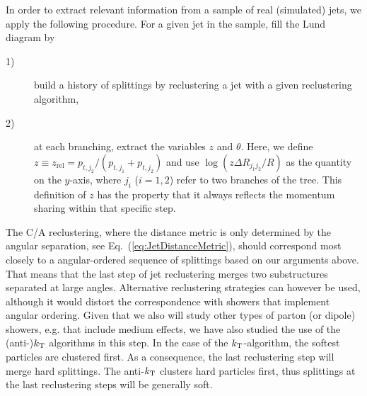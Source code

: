 In order to extract relevant information from a sample of real (simulated) jets, we apply the following procedure.
For a given jet in the sample, fill the Lund diagram by
\begin{description}
\item[1)] build a history of splittings by reclustering a jet with a given reclustering algorithm,
\item[2)] at each branching, extract the variables $z$ and $\theta$. Here, we define $z \equiv z_\text{rel} = p_{t,j_2}/(p_{t,j_1}+p_{t,j_2})$ and use $\log(z \Delta R_{j_1 j_2}/R)$ as the quantity on the $y$-axis, where $j_i$ ($i=1,2$) refer to two branches of the tree.
This definition of $z$ has the property that it always reflects the momentum sharing within that  specific step.

\end{description}
The C/A reclustering, where the distance metric is only determined by the angular separation, see Eq.~(\ref{eq:JetDistanceMetric}), should correspond most closely to a angular-ordered sequence of splittings based on our arguments above. That means that the last step of jet reclustering merges two substructures separated at large angles.
Alternative reclustering strategies can however be used, although it would distort the correspondence with showers that implement angular ordering. Given that we also will study other types of parton (or dipole) showers, e.g. that include medium effects, we have also studied the use of the (anti-)$k_{\rm \tiny T}$ algorithms in this step. 
In the case of the $k_{\rm \tiny T}$-algorithm, the softest particles are clustered first. As a consequence, the last reclustering step will merge hard splittings. The anti-$k_{\rm \tiny T}$ clusters hard particles first, thus splittings at the last reclustering steps will be generally soft. 


